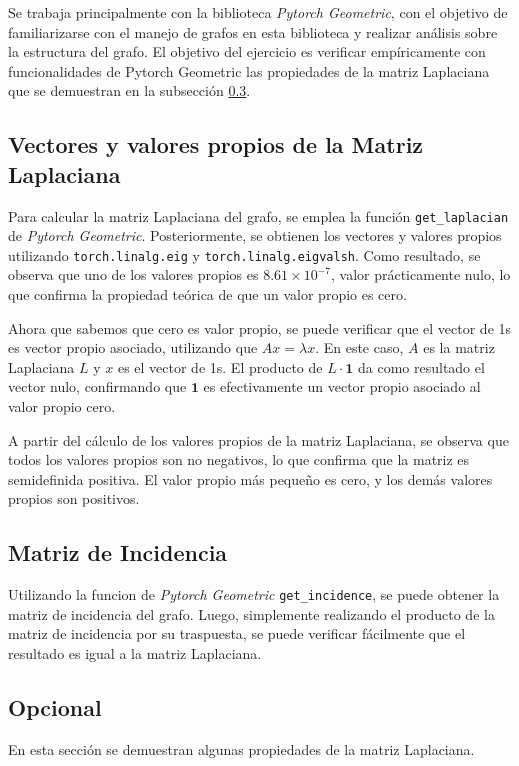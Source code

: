 \documentclass{article}
\begin{document}
Se trabaja principalmente con la biblioteca \textit{Pytorch Geometric}, con el objetivo de familiarizarse con el manejo de grafos en esta biblioteca y realizar análisis sobre la estructura del grafo. El objetivo del ejercicio es verificar empíricamente con funcionalidades de Pytorch Geometric las propiedades de la matriz Laplaciana que se demuestran en la subsección \ref{subsec:opcional}.

\subsection{Vectores y valores propios de la Matriz Laplaciana}
Para calcular la matriz Laplaciana del grafo, se emplea la función \verb|get_laplacian| de \textit{Pytorch Geometric}. Posteriormente, se obtienen los vectores y valores propios utilizando \verb|torch.linalg.eig| y \verb|torch.linalg.eigvalsh|. Como resultado, se observa que uno de los valores propios es $8.61 \times 10^{-7}$, valor prácticamente nulo, lo que confirma la propiedad teórica de que un valor propio es cero.

Ahora que sabemos que cero es valor propio, se puede verificar que el vector de 1s es vector propio asociado, utilizando que $Ax = \lambda x$. En este caso, $A$ es la matriz Laplaciana $L$ y $x$ es el vector de 1s. El producto de $L \cdot \mathbf{1}$ da como resultado el vector nulo, confirmando que $\mathbf{1}$ es efectivamente un vector propio asociado al valor propio cero.

A partir del cálculo de los valores propios de la matriz Laplaciana, se observa que todos los valores propios son no negativos, lo que confirma que la matriz es semidefinida positiva. El valor propio más pequeño es cero, y los demás valores propios son positivos.

\subsection{Matriz de Incidencia}
Utilizando la funcion de \textit{Pytorch Geometric} \verb|get_incidence|, se puede obtener la matriz de incidencia del grafo. Luego, simplemente realizando el producto de la matriz de incidencia por su traspuesta, se puede verificar fácilmente que el resultado es igual a la matriz Laplaciana.

\subsection{Opcional} \label{subsec:opcional}
En esta sección se demuestran algunas propiedades de la matriz Laplaciana.
\end{document}
